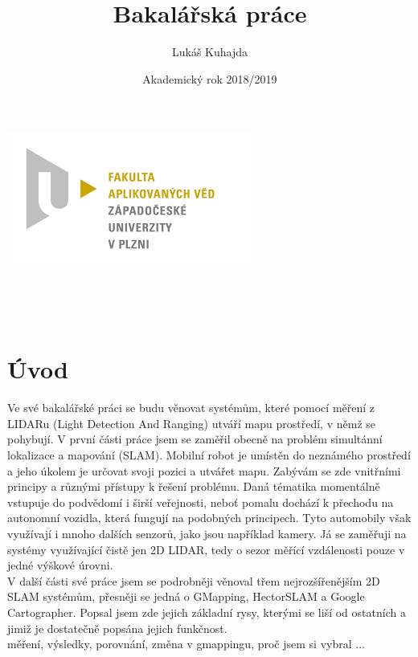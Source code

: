 \documentclass[11pt]{article}
\begin{document}
\title{Bakalářská práce}
\author{Lukáš Kuhajda}
\date{Akademický rok 2018/2019}
\begin{titlepage}
	\begin{center}
		\includegraphics[scale=0.5]{logo_zcu}\\
		\vspace{5cm}
		\begin{Large}
			\textbf{\thetitle}\\
		\end{Large}
		
		\vspace{3cm}
		\theauthor\\
		\vspace{5cm}
		\thedate
	\end{center}
\end{titlepage}
\newpage	
	
\tableofcontents
\newpage





\section{Úvod}
Ve své bakalářské práci se budu věnovat systémům, které pomocí měření z LIDARu (Light Detection And Ranging) utváří mapu prostředí, v němž se pohybují. V první části práce jsem se zaměřil obecně na problém simultánní lokalizace a mapování (SLAM). Mobilní robot je umístěn do neznámého prostředí a jeho úkolem je určovat svoji pozici a utvářet mapu. Zabývám se zde vnitřními principy a různými přístupy k řešení problému. Daná tématika momentálně vstupuje do podvědomí i širší veřejnosti, neboť pomalu dochází k přechodu na autonomní vozidla, která fungují na podobných principech. Tyto automobily však využívají i mnoho dalších senzorů, jako jsou například kamery. Já se zaměřuji na systémy využívající čistě jen 2D LIDAR, tedy o sezor měřící vzdálenosti pouze v jedné výškové úrovni.\\
\indent V další části své práce jsem se podrobněji věnoval třem nejrozšířenějším 2D SLAM systémům, přesněji se jedná o GMapping, HectorSLAM a Google Cartographer. Popsal jsem zde jejich základní rysy, kterými se liší od ostatních a jimiž je dostatečně popsána jejich funkčnost. \\
\indent měření, výsledky, porovnání, změna v gmappingu, proč jsem si vybral ...
\end{document}
